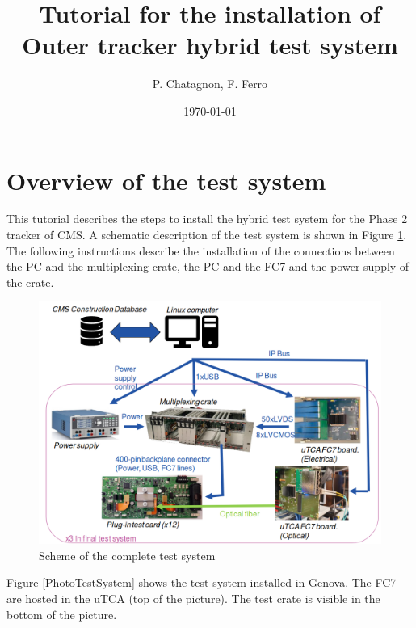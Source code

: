 \documentclass[10pt,a4paper]{article}
\begin{document}
\title{Tutorial for the installation of Outer tracker hybrid test system}
\author{P. Chatagnon, F. Ferro}
\date{\today} 

\maketitle

\section{Overview of the test system}

This tutorial describes the steps to install the hybrid test system for the Phase 2 tracker of CMS. A schematic description of the test system is shown in Figure \ref{TestSchematic}. The following instructions describe the installation of the connections between the PC and the multiplexing crate, the PC and the FC7 and the power supply of the crate. 
\begin{figure}[h!]
 \includegraphics[width=\linewidth]{TestOverview.png} 
  \caption{Scheme of the complete test system}
  \label{TestSchematic}
\end{figure}

Figure \ref{PhotoTestSystem} shows the test system installed in Genova. The FC7 are hosted in the uTCA (top of the picture). The test crate is visible in the bottom of the picture.
\end{document}
